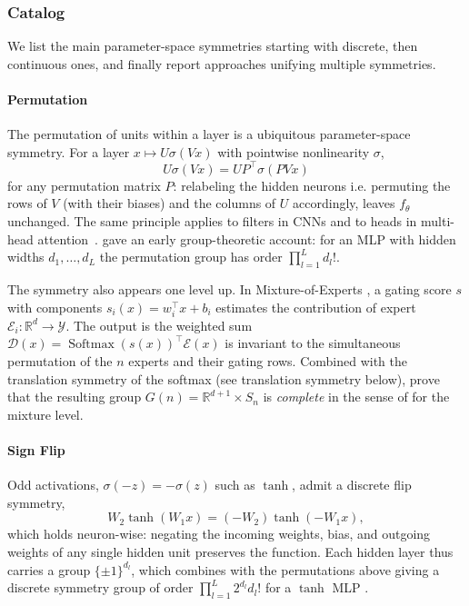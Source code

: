 \documentclass[mathematics,review,submit,moreauthors]{Definitions/mdpi}
\begin{document}
\subsubsection{Catalog}\label{sec:catalog-param-space-symmetries}
We list the main parameter-space symmetries starting with discrete, then continuous ones, and finally report approaches unifying multiple symmetries.

\paragraph{Permutation}
The permutation of units within a layer is a ubiquitous parameter-space symmetry.
For a layer $x\mapsto U\sigma(Vx)$ with pointwise nonlinearity $\sigma$,
\begin{equation*}
    U\sigma(Vx)=UP^{\top}\sigma(PVx)
\end{equation*}
for any permutation matrix $P$: relabeling the hidden neurons i.e. permuting the rows of $V$ (with their biases) and the columns of $U$ accordingly, leaves $f_\theta$ unchanged.
The same principle applies to filters in CNNs and to heads in multi-head attention~\citep{tran2025iclr}.
\citet{hecht-nielsen1990anc} gave an early group-theoretic account: for an MLP with hidden widths $d_1,\dots,d_L$ the permutation group has order $\prod_{l=1}^{L}d_l!$.

The symmetry also appears one level up.
In Mixture-of-Experts \citep{shazeer2017}, a gating score $s$ with components $s_i(x)=w_i^{\top}x+b_i$ estimates the contribution of expert $\mathcal{E}_i:\mathbb{R}^d\to\mathcal{Y}$.
The output is the weighted sum $\mathcal{D}(x)=\operatorname{Softmax}(s(x))^{\top}\mathcal{E}(x)$ is invariant to the simultaneous permutation of the $n$ experts and their gating rows.
Combined with the translation symmetry of the softmax (see translation symmetry below), \citet{tran2025anips} prove that the resulting group $G(n)=\mathbb{R}^{d+1}\times S_n$ is \emph{complete} in the sense of  for the mixture level.

\paragraph{Sign Flip}
Odd activations, $\sigma(-z)=-\sigma(z)$ such as $\tanh$, admit a discrete flip symmetry,
\begin{equation*}
    W_2\tanh(W_1x)=(-W_2)\tanh(-W_1x),
\end{equation*}
which holds neuron-wise: negating the incoming weights, bias, and outgoing weights of any single hidden unit preserves the function.
Each hidden layer thus carries a group $\{\pm 1\}^{d_l}$, which combines with the permutations above giving a discrete symmetry group of order $\prod_{l=1}^{L}2^{d_l}d_l!$ for a $\tanh$ MLP \citep{hecht-nielsen1990anc}.
\end{document}
